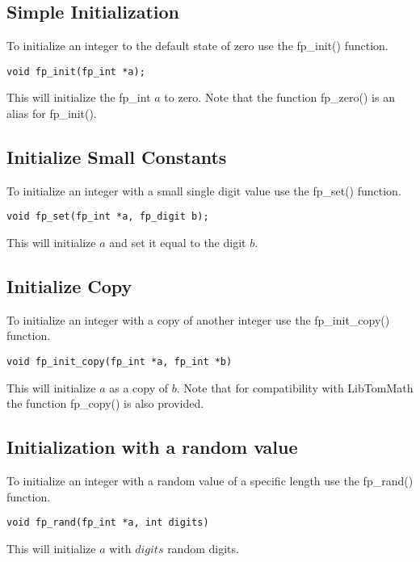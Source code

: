 \documentclass[b5paper]{book}
\begin{document}
\subsection{Simple Initialization}
To initialize an integer to the default state of zero use the fp\_init() function.

\begin{verbatim}
void fp_init(fp_int *a);
\end{verbatim}

This will initialize the fp\_int $a$ to zero.  Note that the function fp\_zero() is an alias
for fp\_init().

\subsection{Initialize Small Constants}
To initialize an integer with a small single digit value use the fp\_set() function.

\begin{verbatim}
void fp_set(fp_int *a, fp_digit b);
\end{verbatim}

This will initialize $a$ and set it equal to the digit $b$.  

\subsection{Initialize Copy}
To initialize an integer with a copy of another integer use the fp\_init\_copy() function.

\begin{verbatim}
void fp_init_copy(fp_int *a, fp_int *b)
\end{verbatim}

This will initialize $a$ as a copy of $b$.  Note that for compatibility with LibTomMath the function
fp\_copy() is also provided.

\subsection{Initialization with a random value}
To initialize an integer with a random value of a specific length use the fp\_rand() function.

\begin{verbatim}
void fp_rand(fp_int *a, int digits)
\end{verbatim}

This will initialize $a$ with $digits$ random digits.
\end{document}

